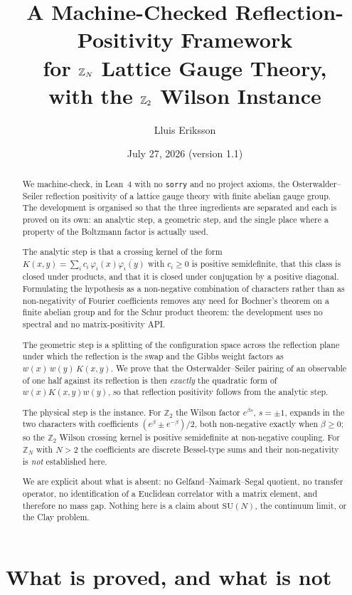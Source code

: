\documentclass[11pt]{article}
\title{A Machine-Checked Reflection-Positivity Framework\\
for $\Z_N$ Lattice Gauge Theory,\\
with the $\Z_2$ Wilson Instance}
\author{Lluis Eriksson}
\date{July 27, 2026 (version 1.1)}
\theoremstyle{definition}
\newcommand{\lean}[1]{\texttt{#1}}
\newcommand{\Z}{\mathbb{Z}}
\newcommand{\SU}{\mathrm{SU}}
\begin{document}
\maketitle

\begin{abstract}
We machine-check, in Lean~4 with no \lean{sorry} and no project axioms, the
Osterwalder--Seiler reflection positivity of a lattice gauge theory with finite
abelian gauge group.  The development is organised so that the three
ingredients are separated and each is proved on its own: an analytic step, a
geometric step, and the single place where a property of the Boltzmann factor
is actually used.

The analytic step is that a crossing kernel of the form
$K(x,y) = \sum_i c_i\,\varphi_i(x)\overline{\varphi_i(y)}$ with $c_i \ge 0$ is
positive semidefinite, that this class is closed under products, and that it is
closed under conjugation by a positive diagonal.  Formulating the hypothesis as
a non-negative combination of characters rather than as non-negativity of
Fourier coefficients removes any need for Bochner's theorem on a finite abelian
group and for the Schur product theorem: the development uses no spectral and
no matrix-positivity API.

The geometric step is a splitting of the configuration space across the
reflection plane under which the reflection is the swap and the Gibbs weight
factors as $w(x)\,w(y)\,K(x,y)$.  We prove that the Osterwalder--Seiler pairing
of an observable of one half against its reflection is then \emph{exactly} the
quadratic form of $w(x)K(x,y)w(y)$, so that reflection positivity follows from
the analytic step.

The physical step is the instance.  For $\Z_2$ the Wilson factor
$e^{\beta s}$, $s = \pm 1$, expands in the two characters with coefficients
$(e^{\beta} \pm e^{-\beta})/2$, both non-negative exactly when $\beta \ge 0$;
so the $\Z_2$ Wilson crossing kernel is positive semidefinite at non-negative
coupling.  For $\Z_N$ with $N > 2$ the coefficients are discrete Bessel-type
sums and their non-negativity is \emph{not} established here.

We are explicit about what is absent: no Gelfand--Naimark--Segal quotient, no
transfer operator, no identification of a Euclidean correlator with a matrix
element, and therefore no mass gap.  Nothing here is a claim about $\SU(N)$,
the continuum limit, or the Clay problem.
\end{abstract}

\section{What is proved, and what is not}
\end{document}

